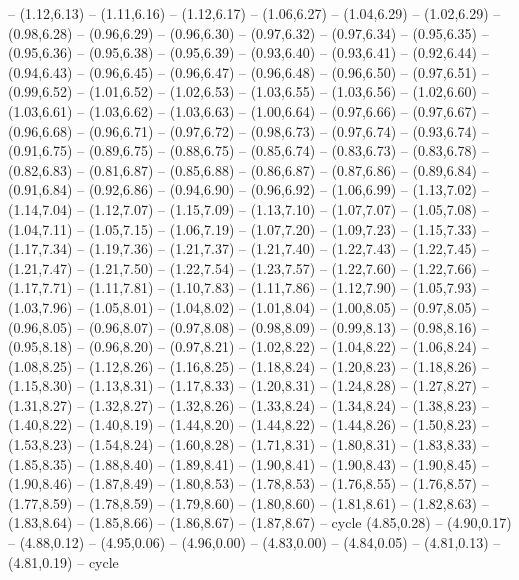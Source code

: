 {-- (1.12,6.13) -- (1.11,6.16) -- (1.12,6.17) -- (1.06,6.27) -- (1.04,6.29) -- (1.02,6.29) -- (0.98,6.28) -- (0.96,6.29) -- (0.96,6.30) -- (0.97,6.32) -- (0.97,6.34) -- (0.95,6.35) -- (0.95,6.36) -- (0.95,6.38) -- (0.95,6.39) -- (0.93,6.40) -- (0.93,6.41) -- (0.92,6.44) -- (0.94,6.43) -- (0.96,6.45) -- (0.96,6.47) -- (0.96,6.48) -- (0.96,6.50) -- (0.97,6.51) -- (0.99,6.52) -- (1.01,6.52) -- (1.02,6.53) -- (1.03,6.55) -- (1.03,6.56) -- (1.02,6.60) -- (1.03,6.61) -- (1.03,6.62) -- (1.03,6.63) -- (1.00,6.64) -- (0.97,6.66) -- (0.97,6.67) -- (0.96,6.68) -- (0.96,6.71) -- (0.97,6.72) -- (0.98,6.73) -- (0.97,6.74) -- (0.93,6.74) -- (0.91,6.75) -- (0.89,6.75) -- (0.88,6.75) -- (0.85,6.74) -- (0.83,6.73) -- (0.83,6.78) -- (0.82,6.83) -- (0.81,6.87) -- (0.85,6.88) -- (0.86,6.87) -- (0.87,6.86) -- (0.89,6.84) -- (0.91,6.84) -- (0.92,6.86) -- (0.94,6.90) -- (0.96,6.92) -- (1.06,6.99) -- (1.13,7.02) -- (1.14,7.04) -- (1.12,7.07) -- (1.15,7.09) -- (1.13,7.10) -- (1.07,7.07) -- (1.05,7.08) -- (1.04,7.11) -- (1.05,7.15) -- (1.06,7.19) -- (1.07,7.20) -- (1.09,7.23) -- (1.15,7.33) -- (1.17,7.34) -- (1.19,7.36) -- (1.21,7.37) -- (1.21,7.40) -- (1.22,7.43) -- (1.22,7.45) -- (1.21,7.47) -- (1.21,7.50) -- (1.22,7.54) -- (1.23,7.57) -- (1.22,7.60) -- (1.22,7.66) -- (1.17,7.71) -- (1.11,7.81) -- (1.10,7.83) -- (1.11,7.86) -- (1.12,7.90) -- (1.05,7.93) -- (1.03,7.96) -- (1.05,8.01) -- (1.04,8.02) -- (1.01,8.04) -- (1.00,8.05) -- (0.97,8.05) -- (0.96,8.05) -- (0.96,8.07) -- (0.97,8.08) -- (0.98,8.09) -- (0.99,8.13) -- (0.98,8.16) -- (0.95,8.18) -- (0.96,8.20) -- (0.97,8.21) -- (1.02,8.22) -- (1.04,8.22) -- (1.06,8.24) -- (1.08,8.25) -- (1.12,8.26) -- (1.16,8.25) -- (1.18,8.24) -- (1.20,8.23) -- (1.18,8.26) -- (1.15,8.30) -- (1.13,8.31) -- (1.17,8.33) -- (1.20,8.31) -- (1.24,8.28) -- (1.27,8.27) -- (1.31,8.27) -- (1.32,8.27) -- (1.32,8.26) -- (1.33,8.24) -- (1.34,8.24) -- (1.38,8.23) -- (1.40,8.22) -- (1.40,8.19) -- (1.44,8.20) -- (1.44,8.22) -- (1.44,8.26) -- (1.50,8.23) -- (1.53,8.23) -- (1.54,8.24) -- (1.60,8.28) -- (1.71,8.31) -- (1.80,8.31) -- (1.83,8.33) -- (1.85,8.35) -- (1.88,8.40) -- (1.89,8.41) -- (1.90,8.41) -- (1.90,8.43) -- (1.90,8.45) -- (1.90,8.46) -- (1.87,8.49) -- (1.80,8.53) -- (1.78,8.53) -- (1.76,8.55) -- (1.76,8.57) -- (1.77,8.59) -- (1.78,8.59) -- (1.79,8.60) -- (1.80,8.60) -- (1.81,8.61) -- (1.82,8.63) -- (1.83,8.64) -- (1.85,8.66) -- (1.86,8.67) -- (1.87,8.67) -- cycle}
\expandafter\def\csname geo:gebiet:LIE\endcsname{
  (4.85,0.28) -- (4.90,0.17) -- (4.88,0.12) -- (4.95,0.06) -- (4.96,0.00) -- (4.83,0.00) -- (4.84,0.05) -- (4.81,0.13) -- (4.81,0.19) -- cycle}
